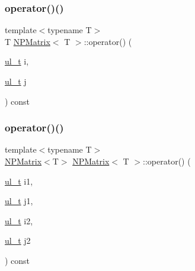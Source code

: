 \subsubsection{\texorpdfstring{operator()()}{operator()()}\hspace{0.1cm}{\footnotesize\ttfamily [2/4]}}
{\footnotesize\ttfamily template$<$typename T$>$ \\
T \mbox{\hyperlink{class_n_p_matrix}{N\+P\+Matrix}}$<$ T $>$\+::operator() (\begin{DoxyParamCaption}\item[{\mbox{\hyperlink{group___n_algebra_ga1b140a2034db3f5dfe18a987745df43a}{ul\+\_\+t}}}]{i,  }\item[{\mbox{\hyperlink{group___n_algebra_ga1b140a2034db3f5dfe18a987745df43a}{ul\+\_\+t}}}]{j }\end{DoxyParamCaption}) const\hspace{0.3cm}{\ttfamily [inline]}}

\mbox{\label{class_n_p_matrix_ab99139270be6ffff19fdf3b5765f321c}} 
\subsubsection{\texorpdfstring{operator()()}{operator()()}\hspace{0.1cm}{\footnotesize\ttfamily [3/4]}}
{\footnotesize\ttfamily template$<$typename T$>$ \\
\mbox{\hyperlink{class_n_p_matrix}{N\+P\+Matrix}}$<$T$>$ \mbox{\hyperlink{class_n_p_matrix}{N\+P\+Matrix}}$<$ T $>$\+::operator() (\begin{DoxyParamCaption}\item[{\mbox{\hyperlink{group___n_algebra_ga1b140a2034db3f5dfe18a987745df43a}{ul\+\_\+t}}}]{i1,  }\item[{\mbox{\hyperlink{group___n_algebra_ga1b140a2034db3f5dfe18a987745df43a}{ul\+\_\+t}}}]{j1,  }\item[{\mbox{\hyperlink{group___n_algebra_ga1b140a2034db3f5dfe18a987745df43a}{ul\+\_\+t}}}]{i2,  }\item[{\mbox{\hyperlink{group___n_algebra_ga1b140a2034db3f5dfe18a987745df43a}{ul\+\_\+t}}}]{j2 }\end{DoxyParamCaption}) const\hspace{0.3cm}{\ttfamily [inline]}}



